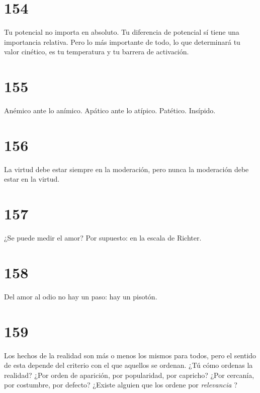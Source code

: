 \documentclass[a4paper,11pt,openright,twocolumn]{book}
\begin{document}
\section*{154}

Tu potencial no importa en absoluto. Tu diferencia de potencial sí tiene una importancia relativa. Pero lo más
importante de todo, lo que determinará tu valor cinético, es tu temperatura y tu barrera de activación. 

\section*{155}

Anémico ante lo anímico. Apático ante lo atípico. Patético. Insípido.

\section*{156}

La virtud debe estar siempre en la moderación, pero nunca la moderación debe estar en la virtud. 

\section*{157}

¿Se puede medir el amor? Por supuesto: en la escala de Richter. 

\section*{158}

Del amor al odio no hay un paso: hay un pisotón.

\section*{159}

Los hechos de la realidad son más o menos los mismos para todos, pero el sentido de esta depende del
criterio con el que aquellos se ordenan. ¿Tú cómo ordenas la realidad? ¿Por orden de aparición, por
popularidad, por capricho? ¿Por cercanía, por costumbre, por defecto? ¿Existe alguien que los ordene por {\it relevancia}  ?


\end{document}
